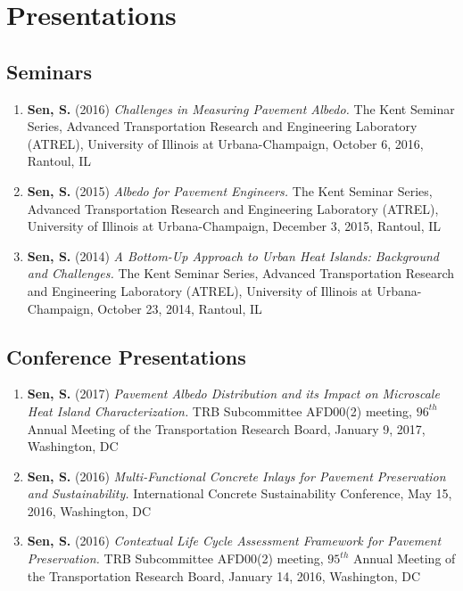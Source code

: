 \documentclass[12pt]{article}
\begin{document}
\section*{Presentations}
\subsection*{Seminars}
\begin{enumerate}[label=(\arabic*)]
	\item \textbf{Sen, S.} (2016) \textit{Challenges in Measuring Pavement Albedo.} The Kent Seminar Series, Advanced Transportation Research and Engineering Laboratory (ATREL), University of Illinois at Urbana-Champaign, October 6, 2016, Rantoul, IL
	\item \textbf{Sen, S.} (2015) \textit{Albedo for Pavement Engineers.} The Kent Seminar Series, Advanced Transportation Research and Engineering Laboratory (ATREL), University of Illinois at Urbana-Champaign, December 3, 2015, Rantoul, IL
	\item \textbf{Sen, S.} (2014) \textit{A Bottom-Up Approach to Urban Heat Islands: Background and Challenges.} The Kent Seminar Series, Advanced Transportation Research and Engineering Laboratory (ATREL), University of Illinois at Urbana-Champaign, October 23, 2014, Rantoul, IL
\end{enumerate}

\subsection*{Conference Presentations}
\begin{enumerate}[label=(\arabic*)]
	\item \textbf{Sen, S.} (2017) \textit{Pavement Albedo Distribution and its Impact on Microscale Heat Island Characterization.} TRB Subcommittee AFD00(2) meeting, $96^{th}$ Annual Meeting of the Transportation Research Board, January 9, 2017, Washington, DC
	\item \textbf{Sen, S.} (2016) \textit{Multi-Functional Concrete Inlays for Pavement Preservation and Sustainability.} International Concrete Sustainability Conference, May 15, 2016, Washington, DC
	\item \textbf{Sen, S.} (2016) \textit{Contextual Life Cycle Assessment Framework for Pavement Preservation.} TRB Subcommittee AFD00(2) meeting, $95^{th}$ Annual Meeting of the Transportation Research Board, January 14, 2016, Washington, DC
\end{enumerate}
\end{document}

